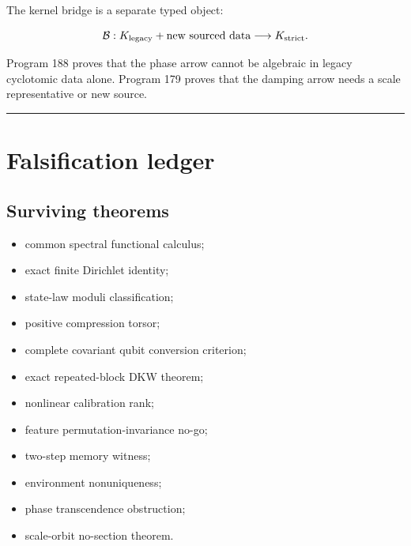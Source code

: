 \documentclass[11pt,a4paper,openany]{report}
\begin{document}
The kernel bridge is a separate typed object:

\[
\mathcal B:
K_{\rm legacy}+\text{new sourced data}
\longrightarrow K_{\rm strict}.
\]

Program 188 proves that the phase arrow cannot be algebraic in legacy cyclotomic data alone. Program 179 proves that the damping arrow needs a scale representative or new source.

\par\medskip\hrule\medskip

\chapter{Falsification ledger}

\section{Surviving theorems}

\begin{itemize}
\item 
common spectral functional calculus;

\item 
exact finite Dirichlet identity;

\item 
state-law moduli classification;

\item 
positive compression torsor;

\item 
complete covariant qubit conversion criterion;

\item 
exact repeated-block DKW theorem;

\item 
nonlinear calibration rank;

\item 
feature permutation-invariance no-go;

\item 
two-step memory witness;

\item 
environment nonuniqueness;

\item 
phase transcendence obstruction;

\item 
scale-orbit no-section theorem.

\end{itemize}
\end{document}
